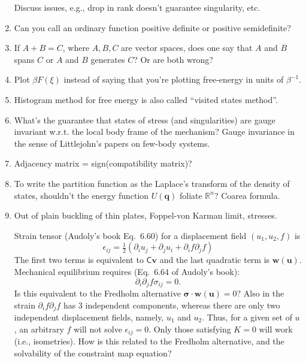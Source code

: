 \begin{enumerate}
  Discuss issues, e.g., drop in rank doesn't guarantee singularity, etc.
  \item Can you call an ordinary function positive definite or positive semidefinite?
  \item If $A + B = C$, where $A, B, C$ are vector spaces, does one say that $A$ and $B$ spans $C$ or $A$ and $B$ generates $C$?  Or are both wrong?
  \item Plot $\beta F(\xi)$ instead of saying that you're plotting free-energy in units of $\beta^{-1}$.
  \item Histogram method for free energy is also called ``visited states method''.
  \item What's the guarantee that states of stress (and singularities) are gauge invariant w.r.t. the local body frame of the mechanism?
    Gauge invariance in the sense of Littlejohn's papers on few-body systems.
  \item Adjacency matrix = sign(compatibility matrix)?
  \item To write the partition function as the Laplace's transform of the density of states, shouldn't the energy function $U(\bm{q})$ foliate $\mathbb{R}^{n}$? Coarea formula.

  \item Out of plain buckling of thin plates, Foppel-von Karman limit, stresses.

    Strain tensor (Audoly's book Eq.~6.60) for a displacement field $(u_{1}, u_{2}, f)$ is
    \begin{equation}
      \epsilon_{ij} = \tfrac{1}{2}\left(\partial_{i} u_{j} + \partial_{j} u_{i} + \partial_{i}f \partial_{j}f\right)
    \end{equation}
    The first two terms is equivalent to $\mathsf{C}\bm{v}$ and the last quadratic term is $\bm{w}(\bm{u})$.
    Mechanical equilibrium requires (Eq.~6.64 of Audoly's book):
    \begin{equation}
      \partial_{i}\partial_{j} f \sigma_{ij} = 0.
    \end{equation}
    Is this equivalent to the Fredholm alternative $\bm{\sigma}\cdot\bm{w}(\bm{u}) = 0$?
    Also in the strain $\partial_{i}f \partial_{j} f$ has 3 independent components, whereas there are only two independent displacement fields, namely, $u_{1}$ and $u_{2}$.  Thus, for a given set of $u$, an arbitrary $f$ will not solve $\epsilon_{ij} = 0$.  Only those satisfying $K = 0$ will work (i.e., isometries).
    How is this related to the Fredholm alternative, and the solvability of the constraint map equation?
\end{enumerate}

